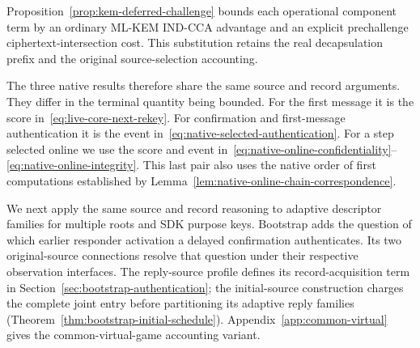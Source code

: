 Proposition~\ref{prop:kem-deferred-challenge} bounds each operational
component term by an ordinary ML-KEM IND-CCA advantage and an explicit
prechallenge ciphertext-intersection cost. This substitution retains the
real decapsulation prefix and the original source-selection accounting.

The three native results therefore share the same source and record
arguments. They differ in the terminal quantity being bounded.
For the first message it is the score in~\eqref{eq:live-core-next-rekey}.
For confirmation and first-message authentication it is the event
in~\eqref{eq:native-selected-authentication}. For a step selected online
we use the score and event in~\eqref{eq:native-online-confidentiality}--%
\eqref{eq:native-online-integrity}. This last pair also uses the native
order of first computations established by
Lemma~\ref{lem:native-online-chain-correspondence}.

We next apply the same source and record reasoning to adaptive descriptor
families for multiple roots and SDK purpose keys. Bootstrap adds the
question of which earlier responder activation a delayed confirmation
authenticates. Its two original-source connections resolve that question
under their respective observation interfaces. The reply-source profile
defines its record-acquisition term in
Section~\ref{sec:bootstrap-authentication}; the initial-source construction
charges the complete joint entry before partitioning its adaptive reply families
(Theorem~\ref{thm:bootstrap-initial-schedule}). Appendix~\ref{app:common-virtual}
gives the common-virtual-game accounting variant.





















